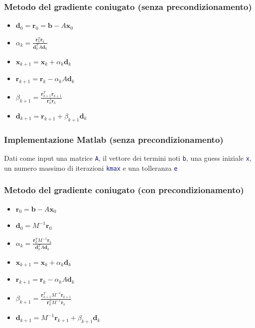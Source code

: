 \documentclass[10pt]{beamer}
\begin{document}
\begin{frame}
\frametitle{Metodo del gradiente coniugato (senza precondizionamento)}
\begin{itemize}
\item $\mathbf{d}_0=\mathbf{r}_0=\mathbf{b}-A\mathbf{x}_0$
\item $\alpha_k=\frac{\mathbf{r}_k^T \mathbf{r}_k}{\mathbf{d}_k^T A \mathbf{d}_k}$
\item $\mathbf{x}_{k+1}=\mathbf{x}_k+\alpha_k\mathbf{d}_{k}$
\item $\mathbf{r}_{k+1}=\mathbf{r}_k-\alpha_kA\mathbf{d}_{k}$
\item $\beta_{k+1}=\frac{\mathbf{r}_{k+1}^T\mathbf{r}_{k+1}}{\mathbf{r}_{k}^T\mathbf{r}_{k}}$
\item $\mathbf{d}_{k+1}=\mathbf{r}_{k+1}+\beta_{k+1}\mathbf{d}_k$
\end{itemize}    
\end{frame}

\begin{frame}\frametitle{Implementazione Matlab (senza precondizionamento)}

Dati come input
una matrice \lstinline[language=Matlab]{A}, 
il vettore dei termini noti \lstinline[language=Matlab]{b},
una guess iniziale \lstinline[language=Matlab]{x},
un numero massimo di iterazioni \lstinline[language=Matlab]{kmax}
e una tolleranza \lstinline[language=Matlab]{e}

\end{frame}

\begin{frame}
\frametitle{Metodo del gradiente coniugato (con precondizionamento)}
\begin{itemize}
\item $\mathbf{r}_0=\mathbf{b}-A\mathbf{x}_0$
\item $\mathbf{d}_0=M^{-1}\mathbf{r}_0$
\item $\alpha_k=\frac{\mathbf{r}_k^TM^{-1} \mathbf{r}_k}{\mathbf{d}_k^T A \mathbf{d}_k}$
\item $\mathbf{x}_{k+1}=\mathbf{x}_k+\alpha_k\mathbf{d}_{k}$
\item $\mathbf{r}_{k+1}=\mathbf{r}_k-\alpha_kA\mathbf{d}_{k}$
\item $\beta_{k+1}=\frac{\mathbf{r}_{k+1}^TM^{-1}\mathbf{r}_{k+1}}{\mathbf{r}_{k}^TM^{-1}\mathbf{r}_{k}}$
\item $\mathbf{d}_{k+1}=M^{-1}\mathbf{r}_{k+1}+\beta_{k+1}\mathbf{d}_k$
\end{itemize}    
\end{frame}
\end{document}
